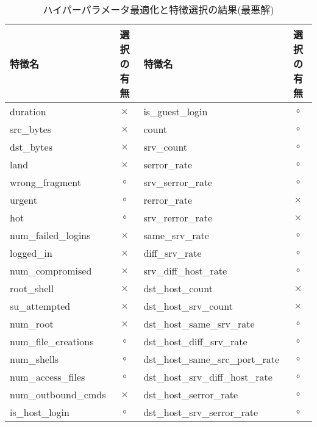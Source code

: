 \begin{table}[htbp]
  \setlength{\tabcolsep}{2pt} %
  \renewcommand{\arraystretch}{0.8} %
  \centering
  \caption{ハイパーパラメータ最適化と特徴選択の結果(最悪解)}
  \begin{tabular}{|l|c|l|c|}
      \hline
      特徴名 & 選択の有無 & 特徴名 & 選択の有無   \\
      \hline
      duration & \(\times\) & is\_guest\_login & \(\circ\) \\
      \hline
      src\_bytes & \(\times\) & count & \(\circ\) \\
      \hline
      dst\_bytes & \(\times\) & srv\_count & \(\circ\)   \\
      \cline{1-4} %
      land & \(\times\) & serror\_rate & \(\circ\)   \\
      \cline{1-4} %
      wrong\_fragment & \(\circ\) & srv\_serror\_rate & \(\circ\)   \\
      \cline{1-4} %
      urgent & \(\circ\) & rerror\_rate & \(\times\)   \\
      \cline{1-4} %
      hot & \(\circ\) & srv\_rerror\_rate & \(\times\)   \\
      \cline{1-4} %
      num\_failed\_logins & \(\times\) & same\_srv\_rate & \(\circ\)   \\
      \cline{1-4} %
      logged\_in & \(\times\) & diff\_srv\_rate & \(\circ\)   \\
      \cline{1-4} %
      num\_compromised & \(\times\) & srv\_diff\_host\_rate & \(\circ\)   \\
      \cline{1-4} %
      root\_shell & \(\times\) & dst\_host\_count & \(\times\)   \\
      \cline{1-4} %
      su\_attempted & \(\times\) & dst\_host\_srv\_count & \(\times\)   \\
      \cline{1-4} %
      num\_root & \(\times\) & dst\_host\_same\_srv\_rate & \(\circ\)   \\
      \cline{1-4} %
      num\_file\_creations & \(\circ\) & dst\_host\_diff\_srv\_rate & \(\circ\)   \\
      \cline{1-4} %
      num\_shells & \(\circ\) & dst\_host\_same\_src\_port\_rate & \(\circ\)   \\
      \cline{1-4} %
      num\_access\_files & \(\circ\) & dst\_host\_srv\_diff\_host\_rate & \(\circ\)   \\
      \cline{1-4} %
      num\_outbound\_cmds & \(\times\) & dst\_host\_serror\_rate & \(\circ\)   \\
      \cline{1-4} %
      is\_host\_login & \(\circ\) & dst\_host\_srv\_serror\_rate & \(\circ\)   \\
      \cline{1-4} %
  \end{tabular}
\end{table}

